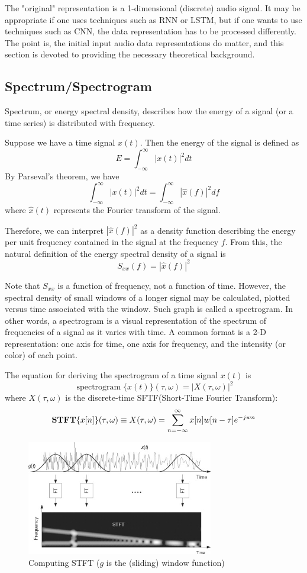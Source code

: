 \documentclass{article}
\DeclareMathOperator{\spectrogram}{spectrogram}
\theoremstyle{plain}
\theoremstyle{definition}
\theoremstyle{remark}
\begin{document}
	The "original" representation is a 1-dimensional (discrete) audio signal.
	It may be appropriate if one uses techniques such as RNN or LSTM, but if one wants to use techniques such as CNN, the data representation has to be processed differently.
	The point is, the initial input audio data representations do matter, and this section is devoted to providing the necessary theoretical background.
	
	
\subsection{Spectrum/Spectrogram}
	Spectrum, or energy spectral density, describes how the energy of a signal (or a time series) is distributed with frequency.
	
	Suppose we have a time signal $x(t)$. Then the energy of the signal is defined as
	$$E = \int_{-\infty}^\infty |x(t)|^2 dt$$
	By Parseval's theorem, we have
	$$\int_{-\infty}^\infty |x(t)|^2 dt = \int_{-\infty}^\infty |\hat{x}(f)|^2 df$$
	where $\hat{x}(t)$ represents the Fourier transform of the signal.
	
	Therefore, we can interpret $|\hat{x}(f)|^2$ as a density function describing the energy per unit frequency contained in the signal at the frequency $f$.
	From this, the natural definition of the energy spectral density of a signal is
	$$S_{xx}(f) = |\hat{x}(f)|^2$$
	
	Note that $S_{xx}$ is a function of frequency, not a function of time.
	However, the spectral density of small windows of a longer signal may be calculated, plotted versus time associated with the window. Such graph is called a spectrogram.
	In other words, a spectrogram is a visual representation of the spectrum of frequencies of a signal as it varies with time.
	A common format is a 2-D representation: one axis for time, one axis for frequency, and the intensity (or color) of each point.
	
	The equation for deriving the spectrogram of a time signal $x(t)$ is
	$$\spectrogram \{x(t)\} (\tau, \omega) = |X(\tau, \omega)|^2$$
	where $X(\tau, \omega)$ is the discrete-time SFTF(Short-Time Fourier Transform):
	$${\bf STFT}\{x[n]\}(\tau, \omega) \equiv X(\tau, \omega) = \sum_{n = -\infty}^\infty x[n] w[n - \tau] e^{-jwn}$$

\begin{figure}[hbt!]
\includegraphics[height=5cm]{fig1.jpg}
    \centering
    \caption{Computing STFT ($g$ is the (sliding) window function)}
\end{figure}	
\end{document}
